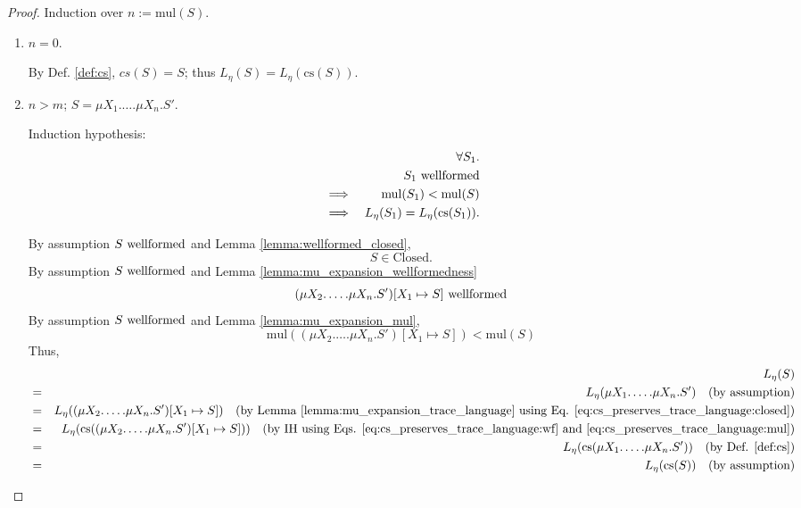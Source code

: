 \documentclass{llncs}
\newcommand*{\cs}{\mathrm{cs}}
\newcommand*{\mul}{\mathrm{mul}}
\newcommand*{\Closed}{\mathrm{Closed}}
\newcommand*{\wf}[1]{\text{$#1$ {\normalfont \rmfamily wellformed}}}
\renewcommand*{\|}{\;|\;}
\begin{document}
\begin{proof}
  Induction over $n := \mul(S)$.
  \begin{enumerate}
    \item
      $n = 0$.

      By Def. \ref{def:cs}, $cs(S) = S$; thus $L_\eta(S) = L_\eta(\cs(S))$.

    \item
      $n > m$; $S = \mu X_1.\dots.\mu X_n.S'$.

      Induction hypothesis:
      \begin{eqnarray*}
        &&         \forall S_1. \\
        &&         \wf{S_1} \\
        &\implies& \mul(S_1) < \mul(S) \\
        &\implies& L_\eta(S_1) = L_\eta(\cs(S_1)).
      \end{eqnarray*}

      By assumption $\wf{S}$ and Lemma \ref{lemma:wellformed_closed},
      \begin{equation}
        \label{eq:cs_preserves_trace_language:closed}
        S \in \Closed.
      \end{equation}
      By assumption $\wf{S}$ and Lemma \ref{lemma:mu_expansion_wellformedness}
      \begin{equation}
        \label{eq:cs_preserves_trace_language:wf}
        \wf{(\mu X_2.\dots.\mu X_n.S')[X_1 \mapsto S]}
      \end{equation}
      By assumption $\wf{S}$ and Lemma \ref{lemma:mu_expansion_mul},
      \begin{equation}
        \label{eq:cs_preserves_trace_language:mul}
        \mul((\mu X_2.\dots.\mu X_n.S')[X_1 \mapsto S]) < \mul(S)
      \end{equation}
      Thus,
      \begin{eqnarray*}
        &&  L_\eta(S) \\
        &=& L_\eta(\mu X_1.\dots.\mu X_n.S')
          \quad \text{(by assumption)} \\
        &=& L_\eta((\mu X_2.\dots.\mu X_n.S')[X_1 \mapsto S])
          \quad \text{(by Lemma \ref{lemma:mu_expansion_trace_language}
          using Eq. \ref{eq:cs_preserves_trace_language:closed})} \\
        &=& L_\eta(\cs((\mu X_2.\dots.\mu X_n.S')[X_1 \mapsto S]))
          \quad \text{(by IH using Eqs. \ref{eq:cs_preserves_trace_language:wf}
          and \ref{eq:cs_preserves_trace_language:mul})} \\
        &=& L_\eta(\cs(\mu X_1.\dots.\mu X_n.S'))
          \quad \text{(by Def. \ref{def:cs})} \\
        &=& L_\eta(\cs(S))
          \quad \text{(by assumption)}
      \end{eqnarray*}
  \end{enumerate}
\end{proof}
\end{document}
